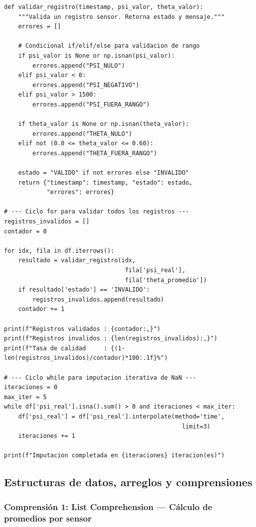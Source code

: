 \documentclass[12pt,a4paper]{article}
\begin{document}
\begin{lstlisting}[caption={Validación de registros con condicionales \texttt{if/elif/else} y ciclo \texttt{for}.}, label=lst:validacion]
def validar_registro(timestamp, psi_valor, theta_valor):
    """Valida un registro sensor. Retorna estado y mensaje."""
    errores = []
    
    # Condicional if/elif/else para validacion de rango
    if psi_valor is None or np.isnan(psi_valor):
        errores.append("PSI_NULO")
    elif psi_valor < 0:
        errores.append("PSI_NEGATIVO")
    elif psi_valor > 1500:
        errores.append("PSI_FUERA_RANGO")
    
    if theta_valor is None or np.isnan(theta_valor):
        errores.append("THETA_NULO")
    elif not (0.0 <= theta_valor <= 0.60):
        errores.append("THETA_FUERA_RANGO")
    
    estado = "VALIDO" if not errores else "INVALIDO"
    return {"timestamp": timestamp, "estado": estado, 
            "errores": errores}

# --- Ciclo for para validar todos los registros ---
registros_invalidos = []
contador = 0

for idx, fila in df.iterrows():
    resultado = validar_registro(idx, 
                                  fila['psi_real'], 
                                  fila['theta_promedio'])
    if resultado['estado'] == 'INVALIDO':
        registros_invalidos.append(resultado)
    contador += 1

print(f"Registros validados : {contador:,}")
print(f"Registros invalidos : {len(registros_invalidos):,}")
print(f"Tasa de calidad     : {(1-len(registros_invalidos)/contador)*100:.1f}%")

# --- Ciclo while para imputacion iterativa de NaN ---
iteraciones = 0
max_iter = 5
while df['psi_real'].isna().sum() > 0 and iteraciones < max_iter:
    df['psi_real'] = df['psi_real'].interpolate(method='time', 
                                                  limit=3)
    iteraciones += 1
    
print(f"Imputacion completada en {iteraciones} iteracion(es)")
\end{lstlisting}

\subsection{Estructuras de datos, arreglos y comprensiones}

\subsubsection{Comprensión 1: List Comprehension --- Cálculo de promedios por sensor}
\end{document}
